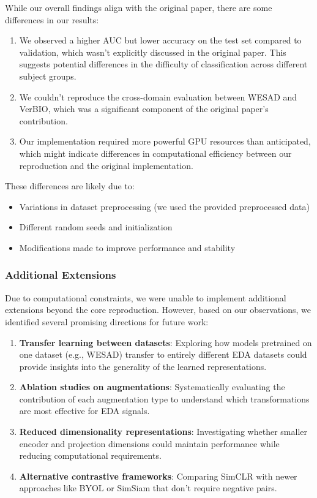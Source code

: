 \documentclass[10pt,letterpaper,twocolumn]{article}
\begin{document}
While our overall findings align with the original paper, there are some differences in our results:

\begin{enumerate}
    \item We observed a higher AUC but lower accuracy on the test set compared to validation, which wasn't explicitly discussed in the original paper. This suggests potential differences in the difficulty of classification across different subject groups.
    
    \item We couldn't reproduce the cross-domain evaluation between WESAD and VerBIO, which was a significant component of the original paper's contribution.
    
    \item Our implementation required more powerful GPU resources than anticipated, which might indicate differences in computational efficiency between our reproduction and the original implementation.
\end{enumerate}

These differences are likely due to:
\begin{itemize}
    \item Variations in dataset preprocessing (we used the provided preprocessed data)
    \item Different random seeds and initialization
    \item Modifications made to improve performance and stability
\end{itemize}

\subsubsection{Additional Extensions}

Due to computational constraints, we were unable to implement additional extensions beyond the core reproduction. However, based on our observations, we identified several promising directions for future work:

\begin{enumerate}
    \item \textbf{Transfer learning between datasets}: Exploring how models pretrained on one dataset (e.g., WESAD) transfer to entirely different EDA datasets could provide insights into the generality of the learned representations.
    
    \item \textbf{Ablation studies on augmentations}: Systematically evaluating the contribution of each augmentation type to understand which transformations are most effective for EDA signals.
    
    \item \textbf{Reduced dimensionality representations}: Investigating whether smaller encoder and projection dimensions could maintain performance while reducing computational requirements.
    
    \item \textbf{Alternative contrastive frameworks}: Comparing SimCLR with newer approaches like BYOL or SimSiam that don't require negative pairs.
\end{enumerate}
\end{document}
